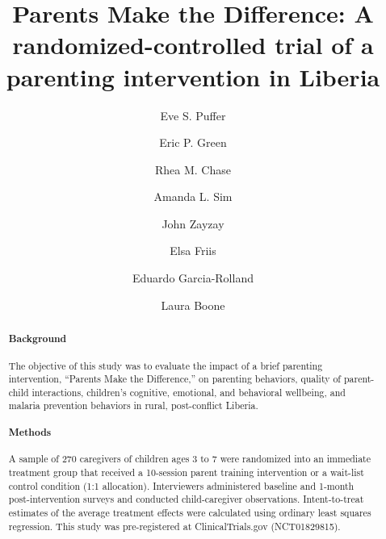 \documentclass[12pt,authoryear]{elsarticle}\usepackage{knitr}
\begin{document}
\thispagestyle{empty}

\begin{frontmatter}

\title{Parents Make the Difference: A randomized-controlled trial of a parenting intervention in Liberia}

\author[add1,add2]{Eve S. Puffer}
\author[add2]{Eric P. Green}
\author[add3]{Rhea M. Chase}
\author[add4]{Amanda L. Sim}
\author[add5]{John Zayzay}
\author[add1]{Elsa Friis}
\author[add4]{Eduardo Garcia-Rolland}
\author[add4]{Laura Boone}


\address[add1]{Duke University, Department of Psychology and Neuroscience, Box 90086, 417 Chapel Drive, Durham, NC 27708, USA}
\address[add2]{Duke Global Health Institute, Box 90519, Durham, North Carolina 27708, USA}
\address[add3]{Duke University Medical Center, Center for Child and Family Health, 411 W. Chapel Hill Street, Suite 908, Durham, NC 27701, USA}
\address[add4]{International Rescue Committee, 122 East 42nd Street, New York, NY 10168, USA}
\address[add5]{International Rescue Committee, Monrovia, Liberia}


\begin{abstract}
\begin{footnotesize}
\begin{spacing}{1}

\paragraph*{Background}
The objective of this study was to evaluate the impact of a brief parenting intervention, ``Parents Make the Difference,'' on parenting behaviors, quality of parent-child interactions, children's cognitive, emotional, and behavioral wellbeing, and malaria prevention behaviors in rural, post-conflict Liberia. 

\paragraph*{Methods}
A sample of 270 caregivers of children ages 3 to 7 were randomized into an immediate treatment group that received a 10-session parent training intervention or a wait-list control condition (1:1 allocation). Interviewers administered baseline and 1-month post-intervention surveys and conducted child-caregiver observations. Intent-to-treat estimates of the average treatment effects were calculated using ordinary least squares regression. This study was pre-registered at ClinicalTrials.gov (NCT01829815). 


\end{spacing}
\end{footnotesize}
\end{abstract}
\end{frontmatter}
\end{document}

